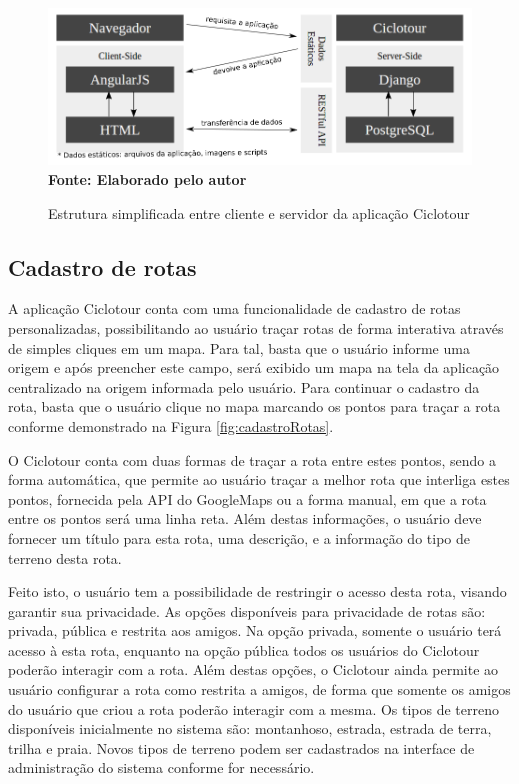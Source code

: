 \begin{figure}[!ht]
	\centering	
	\caption[\hspace{0.1cm} Estrutura simplificada entre cliente e servidor da aplicação Ciclotour.]
	{Estrutura simplificada entre cliente e servidor da aplicação Ciclotour}
	  \vspace{-0.4cm}
	\includegraphics[width=1\textwidth]{figuras/estruturaCiclotour.png}
	 \vspace{-0.3cm}
	\\\textbf{\footnotesize Fonte: Elaborado pelo autor}
	\label{fig:estruturaCiclotour}
\end{figure}

\subsection{Cadastro de rotas}
A aplicação Ciclotour conta com uma funcionalidade de cadastro de rotas personalizadas, possibilitando ao usuário traçar rotas de forma interativa 
através de simples cliques em um mapa. Para tal, basta que o usuário informe uma origem e após preencher este campo, será exibido um mapa na 
tela da aplicação centralizado na origem informada pelo usuário. Para continuar o cadastro da rota, basta que o usuário clique no mapa marcando os 
pontos para traçar a rota conforme demonstrado na Figura \ref{fig:cadastroRotas}. 

O Ciclotour conta com duas formas de traçar a rota entre estes pontos, sendo a forma automática, que permite ao usuário traçar a melhor rota que 
interliga estes pontos, fornecida pela API do GoogleMaps ou a forma manual, em que a rota entre os pontos será uma linha reta. Além destas 
informações, o usuário deve fornecer um título para esta rota, uma descrição, e a informação do tipo de terreno desta rota. 

Feito isto, o usuário tem a possibilidade de restringir o acesso desta rota, visando garantir sua privacidade. As opções disponíveis para privacidade 
de rotas são: privada, pública e restrita aos amigos. Na opção privada, somente o usuário terá acesso à esta rota, enquanto na opção pública todos os 
usuários do Ciclotour poderão interagir com a rota. Além destas opções, o Ciclotour ainda permite ao usuário configurar a rota como restrita a amigos, 
de forma que somente os amigos do usuário que criou a rota poderão interagir com a mesma. Os tipos de terreno disponíveis inicialmente no sistema 
são: montanhoso, estrada, estrada de terra, trilha e praia. Novos tipos de terreno podem ser cadastrados na interface de administração do sistema 
conforme for necessário.

